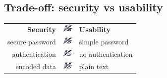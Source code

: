 \subsection{Trade-off: security vs usability}
\begin{frame}
\begin{center}
\begin{Large}
\begin{tabular}{rcl}
\Huge\bfseries Security
& \includegraphics[width=5mm]{img/vs} &
\Huge\bfseries Usability
\\[2em]
\pause
secure password & \includegraphics[width=5mm]{img/vs} & simple password
\\[2em]
\pause
authentication & \includegraphics[width=5mm]{img/vs} & no authentication
\\[2em]
\pause
encoded data & \includegraphics[width=5mm]{img/vs} & plain text
\end{tabular}
\end{Large}
\end{center}
\end{frame}

